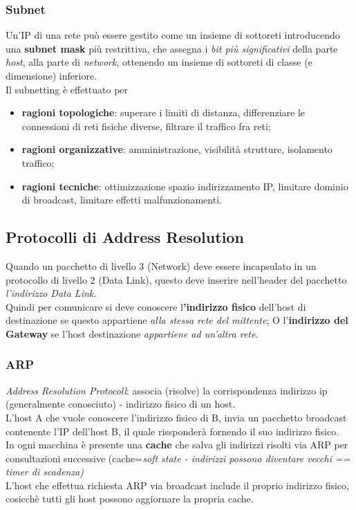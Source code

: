 \documentclass[a4paper,11pt]{article}
\begin{document}
\subsubsection{Subnet}
Un'IP di una rete può essere gestito come un insieme di sottoreti introducendo una \textbf{subnet mask} più restrittiva, che assegna i \textit{bit più significativi} della parte \textit{host}, alla parte di \textit{network}, ottenendo un insieme di sottoreti di classe (e dimensione) inferiore.\\
Il subnetting è effettuato per 
\begin{itemize}
\item\textbf{ragioni topologiche}: superare i limiti di distanza, differenziare le connessioni di reti fisiche diverse, filtrare il traffico fra reti;
\item\textbf{ragioni organizzative}: amministrazione, visibilità strutture, isolamento traffico;
\item\textbf{ragioni tecniche}: ottimizzazione spazio indirizzamento IP, limitare dominio di broadcast, limitare effetti malfunzionamenti.
\end{itemize}

 \subsection{Protocolli di Address Resolution}
 Quando un pacchetto di livello 3 (Network) deve essere incapsulato in un protocollo di livello 2 (Data Link), questo deve inserire nell'header del pacchetto \textit{l'indirizzo Data Link}. \\Quindi per comunicare si deve conoscere l\textbf{'indirizzo fisico} dell'host di destinazione se questo appartiene\textit{ alla stessa rete del mittente}; O l'\textbf{indirizzo del Gateway} se l'host destinazione \textit{appartiene ad un'altra rete}.
 \subsubsection{ARP}
\textit{ Address Resolution Protocoll}: associa (risolve) la corrispondenza indirizzo ip (generalmente conosciuto) - indirizzo fisico di un host. \\
L'host A che vuole conoscere l'indirizzo fisico di B, invia un pacchetto broadcast contenente l'IP dell'host B, il quale rissponderà fornendo il suo indirizzo fisico. \\
In ogni macchina è presente una \textbf{cache} che salva gli indirizzi risolti via ARP per consultazioni successive (cache=\textit{soft state - indirizzi possono diventare vecchi == timer di scadenza)}\\
L'host che effettua richiesta ARP via broadcast include il proprio indirizzo fisico, cosicchè tutti gli host possono aggiornare la propria cache.
\end{document}
